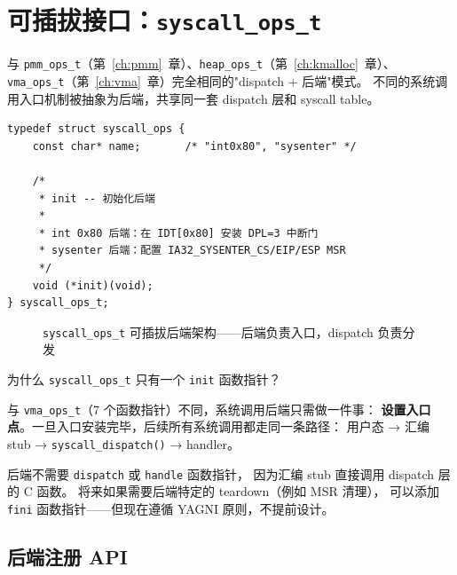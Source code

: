 \section{可插拔接口：\texttt{syscall\_ops\_t}}
\label{sec:syscall-interface}

与 \texttt{pmm\_ops\_t}（第~\ref{ch:pmm}~章）、\texttt{heap\_ops\_t}（第~\ref{ch:kmalloc}~章）、
\texttt{vma\_ops\_t}（第~\ref{ch:vma}~章）完全相同的"dispatch + 后端"模式。
不同的系统调用入口机制被抽象为后端，共享同一套 dispatch 层和 syscall table。

\begin{lstlisting}[style=cstyle]
typedef struct syscall_ops {
    const char* name;       /* "int0x80", "sysenter" */

    /*
     * init -- 初始化后端
     *
     * int 0x80 后端：在 IDT[0x80] 安装 DPL=3 中断门
     * sysenter 后端：配置 IA32_SYSENTER_CS/EIP/ESP MSR
     */
    void (*init)(void);
} syscall_ops_t;
\end{lstlisting}

\begin{figure}[H]
  \centering
  
  \caption{\texttt{syscall\_ops\_t} 可插拔后端架构——后端负责入口，dispatch 负责分发}
  \label{fig:syscall-dispatch}
\end{figure}

\begin{designbox}
为什么 \texttt{syscall\_ops\_t} 只有一个 \texttt{init} 函数指针？

与 \texttt{vma\_ops\_t}（7 个函数指针）不同，系统调用后端只需做一件事：
\textbf{设置入口点}。一旦入口安装完毕，后续所有系统调用都走同一条路径：
用户态 → 汇编 stub → \texttt{syscall\_dispatch()} → handler。

后端不需要 \texttt{dispatch} 或 \texttt{handle} 函数指针，
因为汇编 stub 直接调用 dispatch 层的 C 函数。
将来如果需要后端特定的 teardown（例如 MSR 清理），
可以添加 \texttt{fini} 函数指针——但现在遵循 YAGNI 原则，不提前设计。
\end{designbox}

\subsection{后端注册 API}

